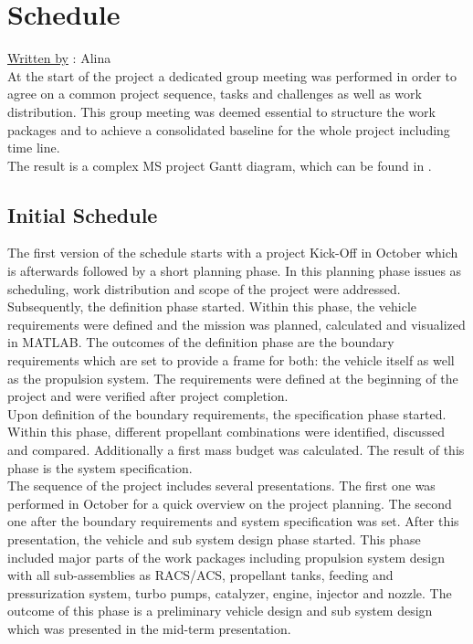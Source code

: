 \chapter{Schedule}
\qquad \underline{Written by} : Alina\\

 At the start of the project a dedicated group meeting was performed in order to agree on a common project sequence, tasks and challenges as well as work distribution. This group meeting was deemed essential to structure the work packages and to achieve a consolidated baseline for the whole project including time line.\\

The result is a complex MS project Gantt diagram, which can be found in .\\
\section{Initial Schedule}
\qquad The first version of the schedule starts with a project Kick-Off in October which is afterwards followed by a short planning phase. In this planning phase issues as scheduling, work distribution and scope of the project were addressed.\\

Subsequently, the definition phase started. Within this phase, the vehicle requirements were defined and the mission was planned, calculated and visualized in MATLAB. The outcomes of the definition phase are the boundary requirements which are set to provide a frame for both: the vehicle itself as well as the propulsion system. The requirements were defined at the beginning of the project and were verified after project completion.\\

Upon definition of the boundary requirements, the specification phase started. Within this phase, different propellant combinations were identified, discussed and compared. Additionally a first mass budget was calculated. The result of this phase is the system specification.\\

The sequence of the project includes several presentations. The first one was performed in October for a quick overview on the project planning. The second one after the boundary requirements and system specification was set. 
After this presentation, the vehicle and sub system design phase started. This phase included major parts of the work packages including propulsion system design with all sub-assemblies as RACS/ACS, propellant tanks, feeding and pressurization system, turbo pumps, catalyzer, engine, injector and nozzle. The outcome of this phase is a preliminary vehicle design and sub system design which was presented in the mid-term presentation.\\

